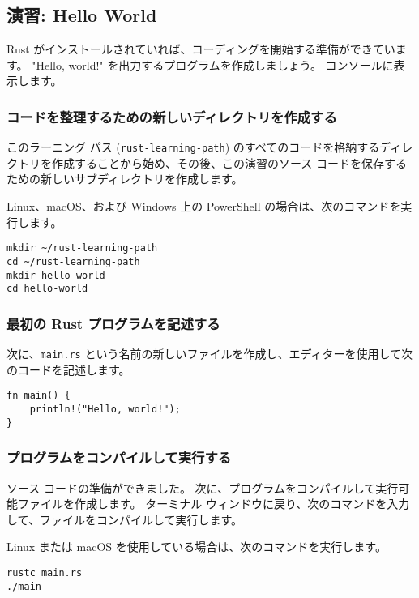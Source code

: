 \subsection{演習: Hello World}

Rust がインストールされていれば、コーディングを開始する準備ができています。 "Hello, world!" を出力するプログラムを作成しましょう。 コンソールに表示します。

\subsubsection{コードを整理するための新しいディレクトリを作成する}

このラーニング パス (\texttt{rust-learning-path}) のすべてのコードを格納するディレクトリを作成することから始め、その後、この演習のソース コードを保存するための新しいサブディレクトリを作成します。

Linux、macOS、および Windows 上の PowerShell の場合は、次のコマンドを実行します。

\begin{lstlisting}[numbers=none]
mkdir ~/rust-learning-path
cd ~/rust-learning-path
mkdir hello-world
cd hello-world
\end{lstlisting}

\subsubsection{最初の Rust プログラムを記述する}

次に、\texttt{main.rs} という名前の新しいファイルを作成し、エディターを使用して次のコードを記述します。

\begin{lstlisting}[numbers=none]
fn main() {
    println!("Hello, world!");
}
\end{lstlisting}

\subsubsection{プログラムをコンパイルして実行する}

ソース コードの準備ができました。 次に、プログラムをコンパイルして実行可能ファイルを作成します。 ターミナル ウィンドウに戻り、次のコマンドを入力して、ファイルをコンパイルして実行します。

Linux または macOS を使用している場合は、次のコマンドを実行します。


\begin{lstlisting}[numbers=none]
rustc main.rs
./main
\end{lstlisting}

